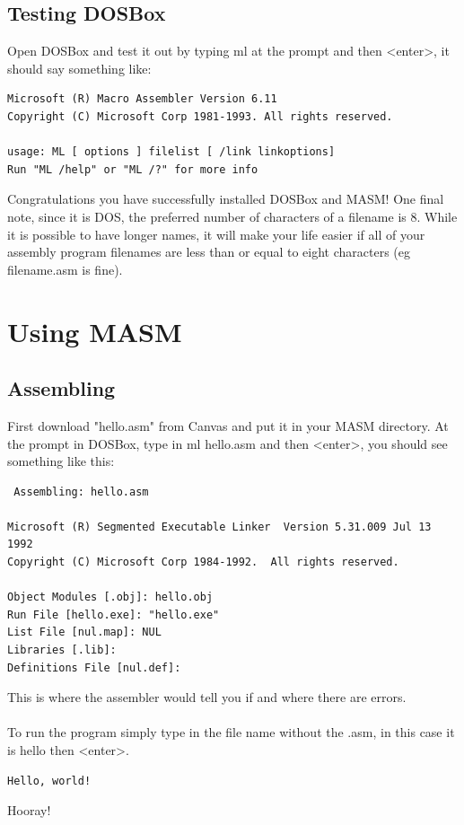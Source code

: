 \subsection{Testing DOSBox}
Open DOSBox and test it out by typing {\code ml} at the prompt and then {\code <enter>}, it should say something like:
\begin{verbatim}
Microsoft (R) Macro Assembler Version 6.11
Copyright (C) Microsoft Corp 1981-1993. All rights reserved.

usage: ML [ options ] filelist [ /link linkoptions]
Run "ML /help" or "ML /?" for more info
\end{verbatim}
Congratulations you have successfully installed DOSBox and MASM!  One final note, since it is DOS, the preferred number of characters of a filename is 8.  While it is possible to have longer names, it will make your life easier if all of your assembly program filenames are less than or equal to eight characters (eg {\code filename.asm} is fine). 

\section{Using MASM}
\subsection{Assembling}
First download "hello.asm" from Canvas and put it in your MASM directory.  At the prompt in DOSBox, type in {\code ml hello.asm} and then {\code <enter>}, you should see something like this:
\begin{verbatim}
 Assembling: hello.asm

Microsoft (R) Segmented Executable Linker  Version 5.31.009 Jul 13 1992
Copyright (C) Microsoft Corp 1984-1992.  All rights reserved.

Object Modules [.obj]: hello.obj 
Run File [hello.exe]: "hello.exe"
List File [nul.map]: NUL
Libraries [.lib]: 
Definitions File [nul.def]: 
\end{verbatim}
This is where the assembler would tell you if and where there are errors.  \\
\\
To run the program simply type in the file name without the .asm, in this case it is {\code hello} then {\code <enter>}. \\
\begin{verbatim}
Hello, world!

\end{verbatim}
Hooray!
